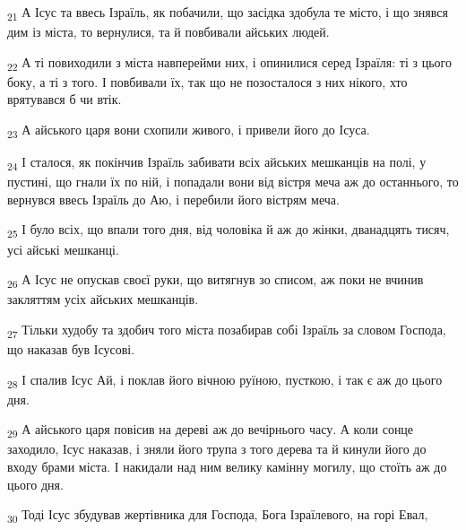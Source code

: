 \begin{tcolorbox}
\textsubscript{21} А Ісус та ввесь Ізраїль, як побачили, що засідка здобула те місто, і що знявся дим із міста, то вернулися, та й повбивали айських людей.
\end{tcolorbox}
\begin{tcolorbox}
\textsubscript{22} А ті повиходили з міста навперейми них, і опинилися серед Ізраїля: ті з цього боку, а ті з того. І повбивали їх, так що не позосталося з них нікого, хто врятувався б чи втік.
\end{tcolorbox}
\begin{tcolorbox}
\textsubscript{23} А айського царя вони схопили живого, і привели його до Ісуса.
\end{tcolorbox}
\begin{tcolorbox}
\textsubscript{24} І сталося, як покінчив Ізраїль забивати всіх айських мешканців на полі, у пустині, що гнали їх по ній, і попадали вони від вістря меча аж до останнього, то вернувся ввесь Ізраїль до Аю, і перебили його вістрям меча.
\end{tcolorbox}
\begin{tcolorbox}
\textsubscript{25} І було всіх, що впали того дня, від чоловіка й аж до жінки, дванадцять тисяч, усі айські мешканці.
\end{tcolorbox}
\begin{tcolorbox}
\textsubscript{26} А Ісус не опускав своєї руки, що витягнув зо списом, аж поки не вчинив закляттям усіх айських мешканців.
\end{tcolorbox}
\begin{tcolorbox}
\textsubscript{27} Тільки худобу та здобич того міста позабирав собі Ізраїль за словом Господа, що наказав був Ісусові.
\end{tcolorbox}
\begin{tcolorbox}
\textsubscript{28} І спалив Ісус Ай, і поклав його вічною руїною, пусткою, і так є аж до цього дня.
\end{tcolorbox}
\begin{tcolorbox}
\textsubscript{29} А айського царя повісив на дереві аж до вечірнього часу. А коли сонце заходило, Ісус наказав, і зняли його трупа з того дерева та й кинули його до входу брами міста. І накидали над ним велику камінну могилу, що стоїть аж до цього дня.
\end{tcolorbox}
\begin{tcolorbox}
\textsubscript{30} Тоді Ісус збудував жертівника для Господа, Бога Ізраїлевого, на горі Евал,
\end{tcolorbox}
